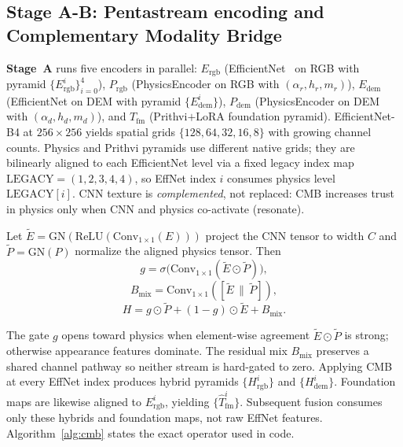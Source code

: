 \subsection{Stage A-B: Pentastream encoding and Complementary Modality Bridge}
\label{sec:encode}
\textbf{Stage~A} runs five encoders in parallel: \(E_{\mathrm{rgb}}\) (EfficientNet~\cite{tan2019efficientnet} on RGB with pyramid \(\{E_{\mathrm{rgb}}^{i}\}_{i=0}^{4}\)), \(P_{\mathrm{rgb}}\) (PhysicsEncoder on RGB with \((\alpha_r,h_r,m_r)\)), \(E_{\mathrm{dem}}\) (EfficientNet on DEM with pyramid \(\{E_{\mathrm{dem}}^{i}\}\)), \(P_{\mathrm{dem}}\) (PhysicsEncoder on DEM with \((\alpha_d,h_d,m_d)\)), and \(T_{\mathrm{fm}}\) (Prithvi$+$LoRA foundation pyramid).
EfficientNet-B4 at \(256\times256\) yields spatial grids \(\{128,64,32,16,8\}\) with growing channel counts. Physics and Prithvi pyramids use different native grids; they are bilinearly aligned to each EfficientNet level via a fixed legacy index map
\(\mathrm{LEGACY}=(1,2,3,4,4)\),
so EffNet index \(i\) consumes physics level \(\mathrm{LEGACY}[i]\). CNN texture is \emph{complemented}, not replaced: CMB increases trust in physics only when CNN and physics co-activate (resonate).

\begin{definition}
\label{def:cmb}
Let \(\tilde{E}=\mathrm{GN}(\mathrm{ReLU}(\mathrm{Conv}_{1\times1}(E)))\) project the CNN tensor to width \(C\) and \(\tilde{P}=\mathrm{GN}(P)\) normalize the aligned physics tensor. Then
\begin{equation}
\label{eq:cmb-g}
g=\sigma\!\bigl(\mathrm{Conv}_{1\times1}(\tilde{E}\odot\tilde{P})\bigr),
\end{equation}
\begin{equation}
\label{eq:cmb-b}
B_{\mathrm{mix}}=\mathrm{Conv}_{1\times1}([\tilde{E}\,\|\,\tilde{P}]),
\end{equation}
\begin{equation}
\label{eq:cmb-h}
H=g\odot\tilde{P}+(1-g)\odot\tilde{E}+B_{\mathrm{mix}}.
\end{equation}
\end{definition}
The gate \(g\) opens toward physics when element-wise agreement \(\tilde{E}\odot\tilde{P}\) is strong; otherwise appearance features dominate. The residual mix \(B_{\mathrm{mix}}\) preserves a shared channel pathway so neither stream is hard-gated to zero. Applying CMB at every EffNet index produces hybrid pyramids \(\{H_{\mathrm{rgb}}^{i}\}\) and \(\{H_{\mathrm{dem}}^{i}\}\). Foundation maps are likewise aligned to \(E_{\mathrm{rgb}}^{i}\), yielding \(\{\hat{T}_{\mathrm{fm}}^{i}\}\). Subsequent fusion consumes only these hybrids and foundation maps, not raw EffNet features. Algorithm~\ref{alg:cmb} states the exact operator used in code.

